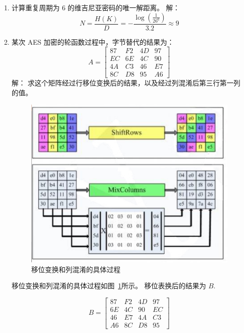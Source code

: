 \documentclass[degree=project,degree-type=project,cjk-font=noto]{thuthesis}
\begin{document}
\begin{enumerate}
\item 计算重复周期为 6 的维吉尼亚密码的唯一解距离。
\newline
{\heiti 解：}
\newline
\begin{equation}
N = \frac{H(K)}{D} = - \frac{\log \left(\frac{1}{26^6}\right)}{3.2} \approx 9
\end{equation}
\newline

\item 某次 AES 加密的轮函数过程中，字节替代的结果为：
\begin{equation}
  A = \begin{bmatrix}
  87 & F2 & 4D & 97 \\
  EC & 6E & 4C & 90 \\
  4A & C3 & 46 & E7 \\
  8C & D8 & 95 & A6
  \end{bmatrix}
\end{equation}
{\heiti 解：}
\newline
求这个矩阵经过行移位变换后的结果，以及经过列混淆后第三行第一列的值。

\begin{figure}[!htp]
\centering%
\includegraphics[width=.7\linewidth]{aes.png}
  \caption{移位变换和列混淆的具体过程}
  \label{fig:aes}
\end{figure}

移位变换和列混淆的具体过程如图~\ref{fig:aes}所示。
移位表换后的结果为 $B$.

\begin{equation}
  B = \begin{bmatrix}
  87 & F2 & 4D & 97 \\
  6E & 4C & 90 & EC \\
  46 & E7 & 4A & C3 \\
  A6 & 8C & D8 & 95
  \end{bmatrix}
\end{equation}


\end{enumerate}
\end{document}
